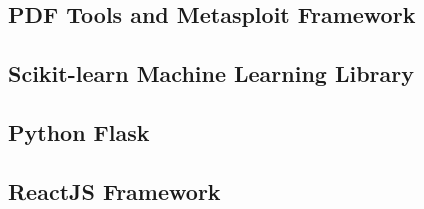 
\subsection{PDF Tools and Metasploit Framework}
\cite{zeltser}
\subsection{Scikit-learn Machine Learning Library}
\subsection{Python Flask}
\subsection{ReactJS Framework}
